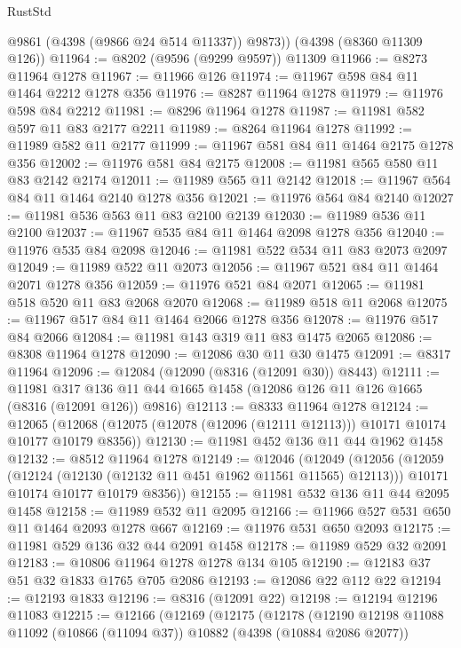 \begin{lexlean}{RustStd}
\begin{coremodule}
        @9861
        (@4398 (@9866 @24 @514 @11337))
        @9873))
    (@4398 (@8360 @11309 @126))
@11964 := @8202 (@9596 (@9299 @9597)) @11309
@11966 := @8273 @11964 @1278
@11967 := @11966 @126
@11974 := @11967 @598 @84 @11 @1464 @2212 @1278 @356
@11976 := @8287 @11964 @1278
@11979 := @11976 @598 @84 @2212
@11981 := @8296 @11964 @1278
@11987 := @11981 @582 @597 @11 @83 @2177 @2211
@11989 := @8264 @11964 @1278
@11992 := @11989 @582 @11 @2177
@11999 := @11967 @581 @84 @11 @1464 @2175 @1278 @356
@12002 := @11976 @581 @84 @2175
@12008 := @11981 @565 @580 @11 @83 @2142 @2174
@12011 := @11989 @565 @11 @2142
@12018 := @11967 @564 @84 @11 @1464 @2140 @1278 @356
@12021 := @11976 @564 @84 @2140
@12027 := @11981 @536 @563 @11 @83 @2100 @2139
@12030 := @11989 @536 @11 @2100
@12037 := @11967 @535 @84 @11 @1464 @2098 @1278 @356
@12040 := @11976 @535 @84 @2098
@12046 := @11981 @522 @534 @11 @83 @2073 @2097
@12049 := @11989 @522 @11 @2073
@12056 := @11967 @521 @84 @11 @1464 @2071 @1278 @356
@12059 := @11976 @521 @84 @2071
@12065 := @11981 @518 @520 @11 @83 @2068 @2070
@12068 := @11989 @518 @11 @2068
@12075 := @11967 @517 @84 @11 @1464 @2066 @1278 @356
@12078 := @11976 @517 @84 @2066
@12084 := @11981 @143 @319 @11 @83 @1475 @2065
@12086 := @8308 @11964 @1278
@12090 := @12086 @30 @11 @30 @1475
@12091 := @8317 @11964
@12096 := @12084 (@12090 (@8316 (@12091 @30)) @8443)
@12111 := @11981
    @317
    @136
    @11
    @44
    @1665
    @1458
    (@12086 @126 @11 @126 @1665 (@8316 (@12091 @126)) @9816)
@12113 := @8333 @11964 @1278
@12124 := @12065
    (@12068 (@12075 (@12078 (@12096 (@12111 @12113))) @10171 @10174 @10177 @10179 @8356))
@12130 := @11981 @452 @136 @11 @44 @1962 @1458
@12132 := @8512 @11964 @1278
@12149 := @12046
    (@12049
      (@12056
        (@12059 (@12124 (@12130 (@12132 @11 @451 @1962 @11561 @11565) @12113)))
        @10171
        @10174
        @10177
        @10179
        @8356))
@12155 := @11981 @532 @136 @11 @44 @2095 @1458
@12158 := @11989 @532 @11 @2095
@12166 := @11966 @527 @531 @650 @11 @1464 @2093 @1278 @667
@12169 := @11976 @531 @650 @2093
@12175 := @11981 @529 @136 @32 @44 @2091 @1458
@12178 := @11989 @529 @32 @2091
@12183 := @10806 @11964 @1278 @1278 @134 @105
@12190 := @12183 @37 @51 @32 @1833 @1765 @705 @2086
@12193 := @12086 @22 @112 @22
@12194 := @12193 @1833
@12196 := @8316 (@12091 @22)
@12198 := @12194 @12196 @11083
@12215 := @12166
    (@12169
      (@12175
        (@12178
          (@12190
            @12198
            @11088
            @11092
            (@10866 (@11094 @37))
            @10882
            (@4398 (@10884 @2086 @2077))

\end{coremodule}
\end{lexlean}
